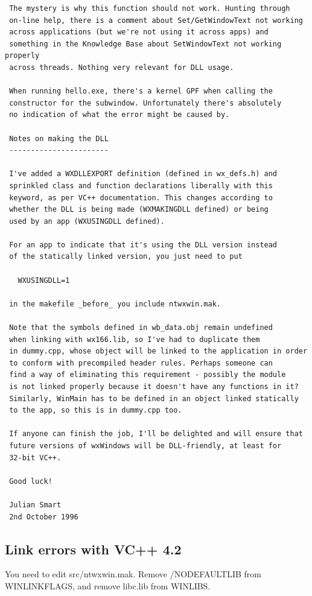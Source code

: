 {\begin{verbatim}
 The mystery is why this function should not work. Hunting through
 on-line help, there is a comment about Set/GetWindowText not working
 across applications (but we're not using it across apps) and
 something in the Knowledge Base about SetWindowText not working properly
 across threads. Nothing very relevant for DLL usage.
 
 When running hello.exe, there's a kernel GPF when calling the
 constructor for the subwindow. Unfortunately there's absolutely
 no indication of what the error might be caused by.
 
 Notes on making the DLL
 -----------------------
 
 I've added a WXDLLEXPORT definition (defined in wx_defs.h) and
 sprinkled class and function declarations liberally with this
 keyword, as per VC++ documentation. This changes according to
 whether the DLL is being made (WXMAKINGDLL defined) or being
 used by an app (WXUSINGDLL defined).
 
 For an app to indicate that it's using the DLL version instead
 of the statically linked version, you just need to put
 
   WXUSINGDLL=1
   
 in the makefile _before_ you include ntwxwin.mak.
 
 Note that the symbols defined in wb_data.obj remain undefined
 when linking with wx166.lib, so I've had to duplicate them
 in dummy.cpp, whose object will be linked to the application in order
 to conform with precompiled header rules. Perhaps someone can
 find a way of eliminating this requirement - possibly the module
 is not linked properly because it doesn't have any functions in it?
 Similarly, WinMain has to be defined in an object linked statically
 to the app, so this is in dummy.cpp too.
 
 If anyone can finish the job, I'll be delighted and will ensure that
 future versions of wxWindows will be DLL-friendly, at least for
 32-bit VC++.
 
 Good luck!
 
 Julian Smart
 2nd October 1996
\end{verbatim}
}

\subsection{Link errors with VC++ 4.2}

You need to edit src/ntwxwin.mak. Remove /NODEFAULTLIB from WINLINKFLAGS, and remove
libc.lib from WINLIBS.

